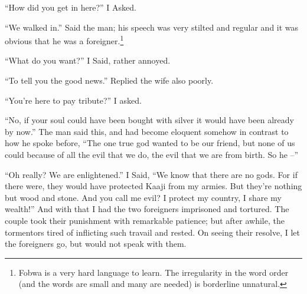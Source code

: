 ``How did you get in here?'' I Asked.

``We walked in.'' Said the man; his speech was very stilted and regular and it was obvious that he was a foreigner.\footnote{Fobwa is a very hard language to learn. The irregularity in the word order (and the words are small and many are needed) is borderline unnatural.}

``What do you want?'' I Said, rather annoyed.

``To tell you the good news.'' Replied the wife also poorly.

``You're here to pay tribute?'' I asked.

``No, if your soul could have been bought with silver it would have been already by now.'' The man said this, and had become eloquent somehow in contrast to how he spoke before, ``The one true god wanted to be our friend, but none of us could because of all the evil that we do, the evil that we are from birth. So he --''

``Oh really? We are enlightened.'' I Said, ``We know that there are no gods. For if there were, they would have protected Kaaji from my armies. But they're nothing but wood and stone. And you call me evil? I protect my country, I share my wealth!'' And with that I had the two foreigners imprisoned and tortured. The couple took their punishment with remarkable patience; but after awhile, the tormentors tired of inflicting such travail and rested. On seeing their resolve, I let the foreigners go, but would not speak with them.
